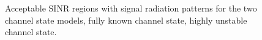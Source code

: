 \begin{figure}[ht]
\begin{center}
\end{center}
\caption{Acceptable SINR regions with signal radiation patterns for the two channel state models,  fully known channel state,  highly unstable channel state.}
\label{fig:rad_pat_sinr}
\end{figure}

